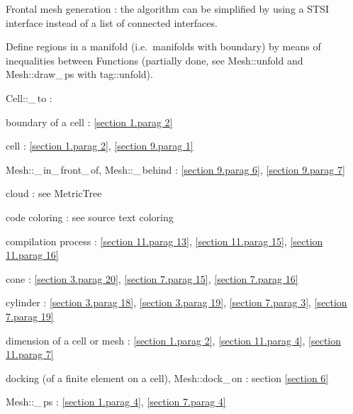 \documentclass[a4paper]{scrreprt}
\def\numb{}
\newcommand\verm[1]{\textcolor{manif}{#1}}
\renewcommand\tt{\normalfont\ttfamily}
\begin{document}
\noindent Frontal mesh generation : the algorithm can be simplified by using
a STSI interface instead of a list of connected interfaces.

\noindent Define regions in a manifold (i.e.\ manifolds with boundary) by means of
inequalities between {\small\tt\verm{Function}}s (partially done, see {\small\tt\verm{Mesh}::unfold}
and {\small\tt\verm{Mesh}::draw\_\,ps} with {\small\tt\textcolor{tag}{tag}::unfold}).





\noindent
{\small\tt\verm{Cell}::\_\,to} : 

\noindent
boundary of a cell : \ref{\numb section 1.\numb parag 2}

\noindent
cell : \ref{\numb section 1.\numb parag 2}, \ref{\numb section 9.\numb parag 1}

\noindent
{\small\tt\verm{Mesh}::\_\,in\_\,front\_\,of},
{\small\tt\verm{Mesh}::\_\,behind} : \ref{\numb section 9.\numb parag 6},
\ref{\numb section 9.\numb parag 7}

\noindent
cloud : see {\small\tt\verm{MetricTree}}

\noindent
code coloring : see source text coloring


\noindent
compilation process : \ref{\numb section 11.\numb parag 13},
\ref{\numb section 11.\numb parag 15}, \ref{\numb section 11.\numb parag 16}

\noindent
cone : \ref{\numb section 3.\numb parag 20}, \ref{\numb section 7.\numb parag 15},
\ref{\numb section 7.\numb parag 16}

\noindent
cylinder : \ref{\numb section 3.\numb parag 18}, \ref{\numb section 3.\numb parag 19},
\ref{\numb section 7.\numb parag 3}, \ref{\numb section 7.\numb parag 19}

\noindent
dimension of a cell or mesh : \ref{\numb section 1.\numb parag 2},
\ref{\numb section 11.\numb parag 4}, \ref{\numb section 11.\numb parag 7}

\noindent
docking (of a finite element on a cell), {\small\tt\verm{Mesh}::dock\_\,on} :
section \ref{\numb section 6}

\noindent
{\small\tt\verm{Mesh}::\_\,ps} : \ref{\numb section 1.\numb parag 4},
\ref{\numb section 7.\numb parag 4}
\end{document}
